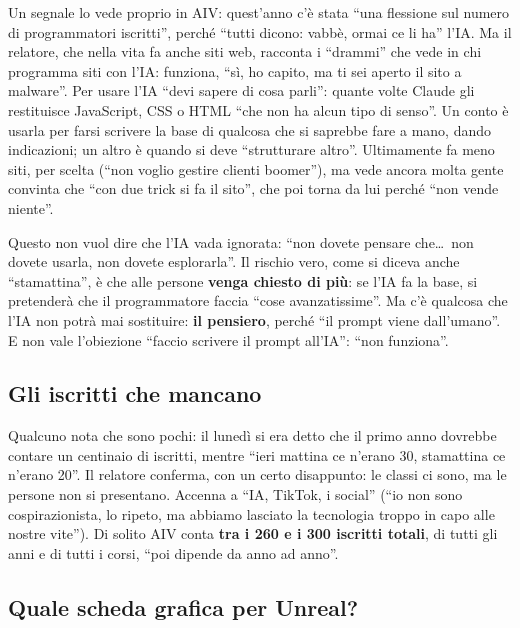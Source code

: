 Un segnale lo vede proprio in AIV: quest'anno c'è stata ``una flessione sul
numero di programmatori iscritti'', perché ``tutti dicono: vabbè, ormai ce
li ha'' l'IA. Ma il relatore, che nella vita fa anche siti web, racconta i
``drammi'' che vede in chi programma siti con l'IA: funziona, ``sì, ho
capito, ma ti sei aperto il sito a malware''. Per usare l'IA ``devi sapere
di cosa parli'': quante volte Claude gli restituisce JavaScript, CSS o HTML
``che non ha alcun tipo di senso''. Un conto è usarla per farsi scrivere la
base di qualcosa che si saprebbe fare a mano, dando indicazioni; un altro è
quando si deve ``strutturare altro''. Ultimamente fa meno siti, per scelta
(``non voglio gestire clienti boomer''), ma vede ancora molta gente
convinta che ``con due trick si fa il sito'', che poi torna da lui perché
``non vende niente''.

Questo non vuol dire che l'IA vada ignorata: ``non dovete pensare che\ldots\
non dovete usarla, non dovete esplorarla''. Il rischio vero, come si diceva
anche ``stamattina'', è che alle persone \textbf{venga chiesto di più}: se
l'IA fa la base, si pretenderà che il programmatore faccia ``cose
avanzatissime''. Ma c'è qualcosa che l'IA non potrà mai sostituire:
\textbf{il pensiero}, perché ``il prompt viene dall'umano''. E non vale
l'obiezione ``faccio scrivere il prompt all'IA'': ``non funziona''.

\subsection{Gli iscritti che mancano}

Qualcuno nota che sono pochi: il lunedì si era detto che il primo anno
dovrebbe contare un centinaio di iscritti, mentre ``ieri mattina ce n'erano
30, stamattina ce n'erano 20''. Il relatore conferma, con un certo
disappunto: le classi ci sono, ma le persone non si presentano. Accenna a
``IA, TikTok, i social'' (``io non sono cospirazionista, lo ripeto, ma
abbiamo lasciato la tecnologia troppo in capo alle nostre vite''). Di
solito AIV conta \textbf{tra i 260 e i 300 iscritti totali}, di tutti gli
anni e di tutti i corsi, ``poi dipende da anno ad anno''.

\subsection{Quale scheda grafica per Unreal?}


